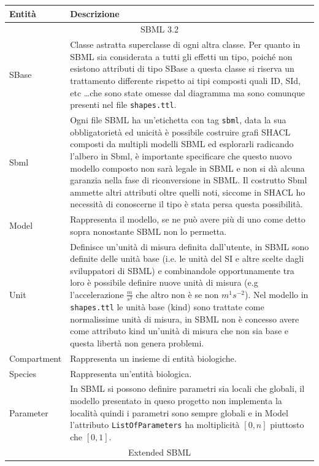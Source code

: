 \documentclass{article}
\begin{document}
\begin{longtable}{p{}p{}}
    \textbf{Entità} & \textbf{Descrizione} \\
    \hline
    \multicolumn{2}{c}{SBML 3.2} \\
    \hline
    SBase & Classe astratta superclasse di ogni altra classe. Per quanto in SBML sia considerata a tutti gli effetti un tipo, poiché non esistono attributi di tipo SBase a questa classe si riserva un trattamento differente rispetto ai tipi composti quali ID, SId, etc \dots che sono state omesse dal diagramma ma sono comunque presenti nel file \texttt{shapes.ttl}. \\ 
    \hline
    Sbml & Ogni file SBML ha un'etichetta con tag \texttt{sbml}, data la sua obbligatorietà ed unicità è possibile costruire grafi SHACL composti da multipli modelli SBML ed esplorarli radicando l'albero in Sbml, è importante specificare che questo nuovo modello composto non sarà legale in SBML e non si dà alcuna garanzia nella fase di riconversione in SBML. Il costrutto Sbml ammette altri attributi oltre quelli noti, siccome in SHACL ho necessità di conoscerne il tipo è stata persa questa possibilità.\\
    \hline
    Model & Rappresenta il modello, se ne può avere più di uno come detto sopra nonostante SBML non lo permetta. \\
    \hline
    Unit & Definisce un'unità di misura definita dall'utente, in SBML sono definite delle unità base (i.e. le unità del SI e altre scelte dagli sviluppatori di SBML) e combinandole opportunamente tra loro è possibile definire nuove unità di misura (e.g l'accelerazione $\frac{m}{s^{2}}$ che altro non è se non $m^{1}s^{-2}$). Nel modello in \texttt{shapes.ttl} le unità base (kind) sono trattate come normalissime unità di misura, in SBML non è concesso avere come attributo kind un'unità di misura che non sia base e questa libertà non genera problemi. \\
    \hline 
    Compartment & Rappresenta un insieme di entità biologiche. \\
    \hline
    Species & Rappresenta un'entità biologica. \\
    \hline
    Parameter & In SBML si possono definire parametri sia locali che globali, il modello presentato in queso progetto non implementa la località quindi i parametri sono sempre globali e in Model l'attributo \texttt{ListOfParameters} ha moltiplicità $[0,n]$ piuttosto che $[0,1]$. \\  
    \hline 
    \multicolumn{2}{c}{Extended SBML} \\

\end{longtable}
\end{document}
